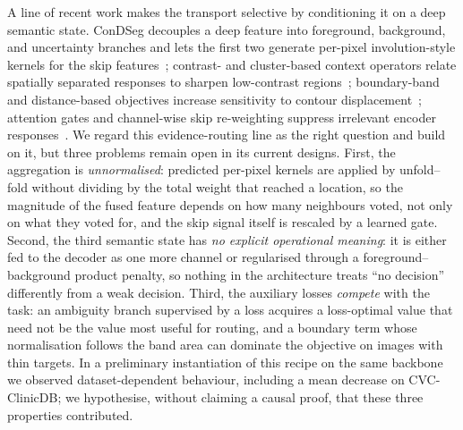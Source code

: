 A line of recent work makes the transport selective by conditioning it on a deep semantic state. ConDSeg decouples a deep feature into foreground, background, and uncertainty branches and lets the first two generate per-pixel involution-style kernels for the skip features~\cite{lei2025condseg}; contrast- and cluster-based context operators relate spatially separated responses to sharpen low-contrast regions~\cite{zhu2025ccvim}; boundary-band and distance-based objectives increase sensitivity to contour displacement~\cite{kervadec2019boundary,karimi2019reducing,wang2022banet}; attention gates and channel-wise skip re-weighting suppress irrelevant encoder responses~\cite{oktay2018attention,wang2022uctransnet,luo2025tamosc}. We regard this evidence-routing line as the right question and build on it, but three problems remain open in its current designs. First, the aggregation is \emph{unnormalised}: predicted per-pixel kernels are applied by unfold--fold without dividing by the total weight that reached a location, so the magnitude of the fused feature depends on how many neighbours voted, not only on what they voted for, and the skip signal itself is rescaled by a learned gate. Second, the third semantic state has \emph{no explicit operational meaning}: it is either fed to the decoder as one more channel or regularised through a foreground--background product penalty, so nothing in the architecture treats ``no decision'' differently from a weak decision. Third, the auxiliary losses \emph{compete} with the task: an ambiguity branch supervised by a loss acquires a loss-optimal value that need not be the value most useful for routing, and a boundary term whose normalisation follows the band area can dominate the objective on images with thin targets. In a preliminary instantiation of this recipe on the same backbone we observed dataset-dependent behaviour, including a mean decrease on CVC-ClinicDB; we hypothesise, without claiming a causal proof, that these three properties contributed.

